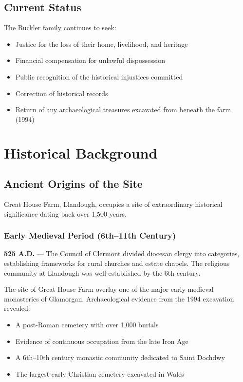 \documentclass[11pt,a4paper]{article}
\begin{document}
\subsection{Current Status}

The Buckler family continues to seek:
\begin{itemize}
    \item Justice for the loss of their home, livelihood, and heritage
    \item Financial compensation for unlawful dispossession
    \item Public recognition of the historical injustices committed
    \item Correction of historical records
    \item Return of any archaeological treasures excavated from beneath the farm (1994)
\end{itemize}

\newpage

\section{Historical Background}

\subsection{Ancient Origins of the Site}

Great House Farm, Llandough, occupies a site of extraordinary historical significance dating back over 1,500 years.

\subsubsection{Early Medieval Period (6th--11th Century)}

\begin{timeline}
\textbf{525 A.D.} --- The Council of Clermont divided diocesan clergy into categories, establishing frameworks for rural churches and estate chapels. The religious community at Llandough was well-established by the 6th century.
\end{timeline}

The site of Great House Farm overlay one of the major early-medieval monasteries of Glamorgan. Archaeological evidence from the 1994 excavation revealed:

\begin{itemize}
    \item A post-Roman cemetery with over 1,000 burials
    \item Evidence of continuous occupation from the late Iron Age
    \item A 6th--10th century monastic community dedicated to Saint Dochdwy
    \item The largest early Christian cemetery excavated in Wales
\end{itemize}
\end{document}
